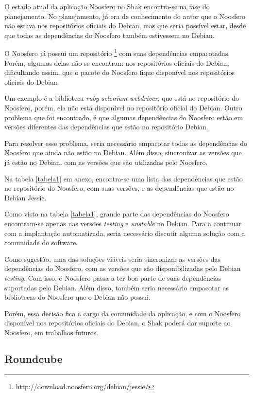O estado atual da aplicação Noosfero no Shak encontra-se
na fase do planejamento. No planejamento, já era de conhecimento do autor que o
Noosfero não estava nos repositórios oficiais do Debian, mas que seria possível estar, 
desde que todas as dependências do Noosfero também estivessem no Debian.

O Noosfero já possui um repositório \footnote{http://download.noosfero.org/debian/jessie/}
com suas dependências empacotadas. Porém, algumas delas não se encontram nos repositórios
oficiais do Debian, dificultando assim, que o pacote do Noosfero fique disponível
nos repositórios oficiais do Debian. 

Um exemplo é a biblioteca \textit{ruby-selenium-webdriver}, que
está no repositório do Noosfero, porém, ela não está disponível no repositório oficial
do Debian. Outro problema que foi encontrado, é que algumas dependências do Noosfero
estão em versões diferentes das dependências que estão no repositório Debian.

Para resolver esse problema, seria necessário empacotar todas as dependências
do Noosfero que ainda não estão no Debian. Além disso, sincronizar as versões
que já estão no Debian, com as versões que são utilizadas pelo Noosfero.

Na tabela \ref{tabela1} em anexo, encontra-se uma lista das dependências 
que estão no repositório do Noosfero,
com suas versões, e as dependências que estão no Debian Jessie.

Como visto na tabela \ref{tabela1}, grande parte das dependências do Noosfero encontram-se
 apenas nas versões \textit{testing} e \textit{unstable} no Debian. Para a continuar com
a implantação automatizada, seria necessário discutir alguma solução 
com a comunidade do software. 

Como sugestão, uma das soluções viáveis seria 
sincronizar as versões das dependências do Noosfero, com as versões que são 
disponibilizadas pelo Debian \textit{testing}. Com isso, o 
Noosfero passa a ter boa parte de suas dependências suportadas pelo Debian. Além disso, 
também seria necessário empacotar as bibliotecas do Noosfero que o Debian não possui. 

Porém, essa decisão fica a cargo da comunidade da aplicação, e com o Noosfero disponível
nos repositórios oficiais do Debian, o Shak poderá dar suporte ao Noosfero, 
em trabalhos futuros.

 \subsection{Roundcube}
\label{sub:owncloud}

